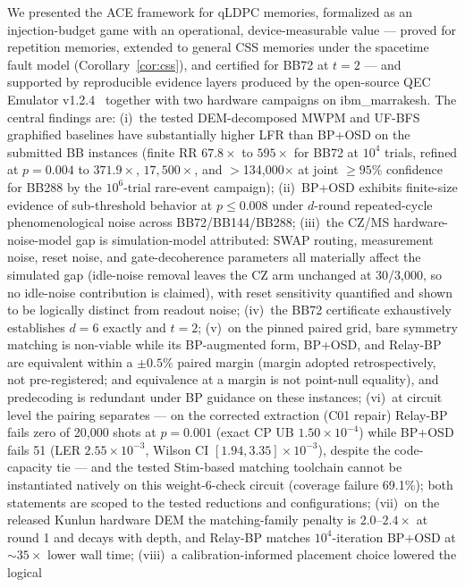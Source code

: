 \documentclass[11pt,a4paper]{article}
\begin{document}
We presented the ACE framework for qLDPC memories, formalized as an
injection-budget game with an operational, device-measurable value ---
proved for repetition memories, extended to general CSS memories under
the spacetime fault model (Corollary~\ref{cor:css}), and certified for
BB72 at $t=2$ --- and supported by reproducible evidence layers
produced by the open-source
QEC Emulator v1.2.4~\cite{AlDaajeh2026emulator} together with two
hardware campaigns on ibm\_marrakesh.
The central findings are:
(i)~the tested DEM-decomposed MWPM and UF-BFS graphified baselines have substantially higher LFR than BP+OSD on the submitted BB instances (finite RR $67.8\times$ to $595\times$ for BB72 at $10^{4}$ trials,
refined at $p=0.004$ to $371.9\times$, $17{,}500\times$, and
$>$134{,}000$\times$ at joint $\ge95\%$ confidence for BB288 by the
$10^{6}$-trial
rare-event campaign);
(ii)~BP+OSD exhibits finite-size evidence of sub-threshold behavior at $p\le0.008$ under
$d$-round repeated-cycle phenomenological noise across BB72/BB144/BB288;
(iii)~the CZ/MS hardware-noise-model gap is simulation-model attributed: SWAP routing, measurement noise, reset noise, and gate-decoherence parameters all materially affect the simulated gap (idle-noise removal leaves the CZ arm unchanged at 30/3{,}000, so no idle-noise contribution is claimed), with reset sensitivity quantified and shown to be logically distinct from readout noise;
(iv)~the BB72 certificate exhaustively establishes $d=6$ exactly and $t=2$;
(v)~on the pinned paired grid, bare symmetry matching is non-viable while its BP-augmented form, BP+OSD, and Relay-BP are equivalent within a $\pm0.5\%$ paired margin (margin adopted retrospectively, not pre-registered; and equivalence at a margin is not point-null equality), and predecoding is redundant under BP guidance on these instances;
(vi)~at circuit level the pairing separates --- on the corrected
extraction (C01 repair) Relay-BP fails zero of 20{,}000 shots at
$p=0.001$ (exact CP UB $1.50\times10^{-4}$) while BP+OSD fails 51
(LER $2.55\times10^{-3}$, Wilson CI $[1.94,3.35]\times10^{-3}$),
despite the code-capacity tie --- and the tested Stim-based matching
toolchain cannot be instantiated natively on this weight-6-check
circuit (coverage failure 69.1\%); both statements are scoped to the
tested reductions and configurations;
(vii)~on the released Kunlun hardware DEM the matching-family penalty
is $2.0$--$2.4\times$ at round 1 and decays with depth, and Relay-BP
matches $10^4$-iteration BP+OSD at $\sim\!35\times$ lower wall time;
(viii)~a calibration-informed placement choice lowered the logical
\end{document}
